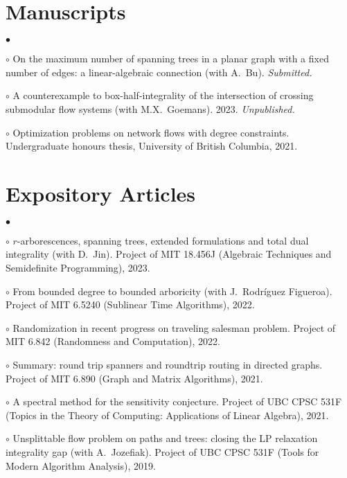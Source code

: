 \documentclass[margin,line]{res}
\newenvironment{list2}{
  \begin{list}{$\bullet$}{%
      \setlength{\itemsep}{0in}
      \setlength{\parsep}{0in} \setlength{\parskip}{0in}
      \setlength{\topsep}{0in} \setlength{\partopsep}{0in}
      \setlength{\leftmargin}{0.2in}}}{\end{list}}
\begin{document}
\begin{resume}
\section{\sc Manuscripts}

\begin{list2}
  \item[$\circ$] On the maximum number of spanning trees in a planar graph with a fixed number of edges: a linear-algebraic connection (with A.\ Bu). \emph{Submitted.}
  \item[$\circ$] A counterexample to box-half-integrality of the intersection of crossing submodular flow systems (with M.X.\ Goemans). 2023. \emph{Unpublished.}
  \item[$\circ$] Optimization problems on network flows with degree constraints. Undergraduate honours thesis, University of British Columbia, 2021. %
\end{list2}


\section{\sc Expository Articles}

\begin{list2}
\item[$\circ$] $r$-arborescences, spanning trees, extended formulations and total dual integrality (with D.\ Jin). Project of MIT 18.456J (Algebraic Techniques and Semidefinite Programming), 2023.
\item[$\circ$] From bounded degree to bounded arboricity (with J.\ Rodríguez Figueroa). Project of MIT 6.5240 (Sublinear Time Algorithms), 2022.
\item[$\circ$] Randomization in recent progress on traveling salesman problem. Project of MIT 6.842 (Randomness and Computation), 2022.
\item[$\circ$] Summary: round trip spanners and roundtrip routing in directed graphs. Project of MIT 6.890 (Graph and Matrix Algorithms), 2021.
\item[$\circ$] A spectral method for the sensitivity conjecture. Project of UBC CPSC 531F (Topics in the Theory of Computing: Applications of Linear Algebra), 2021.
\item[$\circ$] Unsplittable flow problem on paths and trees: closing the LP relaxation integrality gap (with A.\ Jozefiak). Project of UBC CPSC 531F (Tools for Modern Algorithm Analysis), 2019. %
\end{list2}


\end{resume}
\end{document}

